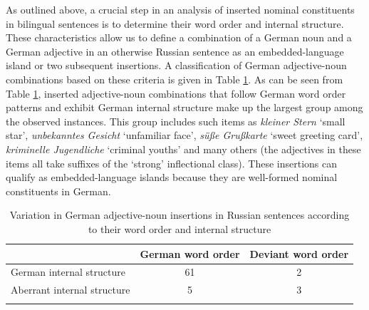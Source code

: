 \begin{sloppypar}
As outlined above, a crucial step in an analysis of inserted nominal constituents in bilingual sentences is to determine their word order and internal structure. These characteristics allow us to define a combination of a German noun and a German adjective in an otherwise Russian sentence as an embedded-language island or two subsequent insertions. A classification of German adjective-noun combinations based on these criteria is given in Table \ref{tab:4:2}. As can be seen from Table \ref{tab:4:2}, inserted adjective-noun combinations that follow German word order patterns and exhibit German internal structure make up the largest group among the observed instances. This group includes such items as \textit{kleiner Stern} `small star', \textit{unbekanntes Gesicht} `unfamiliar face', \textit{süße Grußkarte} `sweet greeting card', \textit{kriminelle Jugendliche} `criminal youths' and many others (the adjectives in these items all take suffixes of the `strong' inflectional class). These insertions can qualify as embedded-language islands because they are well-formed nominal constituents in German.
\end{sloppypar}

\begin{table}
\begin{tabular}{lcc}
\lsptoprule
	    & German word order	& Deviant word order\\ 	\midrule
	German internal structure	& 61	& 2	\\
	Aberrant internal structure & 5	& 3\\
	\lspbottomrule		
	\end{tabular}
	\caption{Variation in German adjective-noun insertions in Russian sentences according to their word order and internal structure\label{tab:4:2}}
\end{table}

